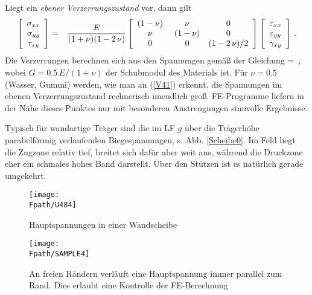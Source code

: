 {Liegt ein {\em ebener Verzerrungszustand}  vor, dann
gilt
\begin{align}\label{V41}
\left[ \barr {c} \sigma_{xx} \\ \sigma_{yy} \\ \tau_{xy}  \earr\right] &=&
\frac{E}{(1+\nu)(1 - 2\,\nu)}\left[ \barr { c c c} (1-\nu) & \,\,\nu & 0 \\ \nu &
\,\,(1-\nu) & 0 \\ 0 & \,\,0 & (1-2\,\nu)/2 \earr \right] \left[ \barr {c}
\varepsilon_{xx} \\ \varepsilon_{yy} \\ \gamma_{xy}  \earr\right]\,.
\end{align}
Die Verzerrungen berechnen sich aus den Spannungen gem\"{a}{\ss} der Gleichung
\bfo
{} =
  \,,
\efo
wobei $G  = 0.5\,E/(1+\nu)$ der Schubmodul des Materials ist.
F\"{u}r $\nu = 0.5$ (Wasser, Gummi) werden, wie man an (\ref{V41}) erkennt, die Spannungen im ebenen Verzerrungszustand rechnerisch unendlich gro{\ss}. FE-Programme liefern in der N\"{a}he dieses Punktes nur mit besonderen Anstrengungen sinnvolle Ergebnisse.

Typisch f\"{u}r wandartige Tr\"{a}ger sind die im LF $g$ \"{u}ber die Tr\"{a}gerh\"{o}he parabelf\"{o}rmig verlaufenden Biegespannungen, s. Abb. \ref{Scheibe0}. Im Feld liegt die Zugzone relativ tief, breitet sich daf\"{u}r aber weit aus, w\"{a}hrend die Druckzone eher ein schmales hohes Band darstellt. \"{U}ber den St\"{u}tzen ist es nat\"{u}rlich gerade umgekehrt.
\begin{figure}[tbp] \centering
\if {} \sidecaption \fi
\texttt{[image: \\Fpath/U484]} %
\caption{Hauptspannungen in einer Wandscheibe} \label{Hauptspannungen}
\end{figure}%
\begin{figure}[tbp] \centering
\if {} \sidecaption \fi
\texttt{[image: \\Fpath/SAMPLE4]}%
\caption{An freien R\"{a}ndern verl\"{a}uft eine Hauptspannung immer parallel zum Rand. Dies
erlaubt eine Kontrolle der FE-Berechnung} \label{Sample4}
\end{figure}%

}
